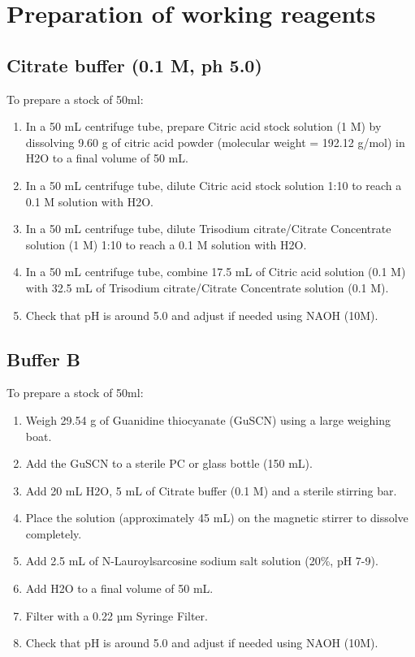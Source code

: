 \documentclass[
]{book}
\providecommand{\tightlist}{%
  \setlength{\itemsep}{0pt}\setlength{\parskip}{0pt}}
\begin{document}
\hypertarget{preparation-of-working-reagents}{%
\section{Preparation of working reagents}\label{preparation-of-working-reagents}}

\hypertarget{citrate-buffer-0.1-m-ph-5.0}{%
\subsection*{Citrate buffer (0.1 M, ph 5.0)}\label{citrate-buffer-0.1-m-ph-5.0}}

To prepare a stock of 50ml:

\begin{enumerate}
\def\labelenumi{\arabic{enumi}.}
\tightlist
\item
  In a 50 mL centrifuge tube, prepare Citric acid stock solution (1 M) by dissolving 9.60 g of citric acid powder (molecular weight = 192.12 g/mol) in H2O to a final volume of 50 mL.
\item
  In a 50 mL centrifuge tube, dilute Citric acid stock solution 1:10 to reach a 0.1 M solution with H2O.
\item
  In a 50 mL centrifuge tube, dilute Trisodium citrate/Citrate Concentrate solution (1 M) 1:10 to reach a 0.1 M solution with H2O.
\item
  In a 50 mL centrifuge tube, combine 17.5 mL of Citric acid solution (0.1 M) with 32.5 mL of Trisodium citrate/Citrate Concentrate solution (0.1 M).
\item
  Check that pH is around 5.0 and adjust if needed using NAOH (10M).
\end{enumerate}

\hypertarget{buffer-b}{%
\subsection*{Buffer B}\label{buffer-b}}

To prepare a stock of 50ml:

\begin{enumerate}
\def\labelenumi{\arabic{enumi}.}
\tightlist
\item
  Weigh 29.54 g of Guanidine thiocyanate (GuSCN) using a large weighing boat.
\item
  Add the GuSCN to a sterile PC or glass bottle (150 mL).
\item
  Add 20 mL H2O, 5 mL of Citrate buffer (0.1 M) and a sterile stirring bar.
\item
  Place the solution (approximately 45 mL) on the magnetic stirrer to dissolve completely.
\item
  Add 2.5 mL of N-Lauroylsarcosine sodium salt solution (20\%, pH 7-9).
\item
  Add H2O to a final volume of 50 mL.
\item
  Filter with a 0.22 µm Syringe Filter.
\item
  Check that pH is around 5.0 and adjust if needed using NAOH (10M).
\end{enumerate}
\end{document}
